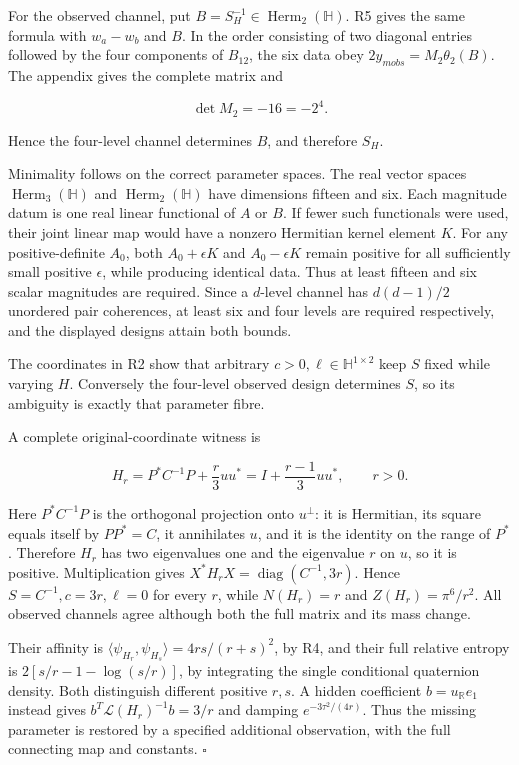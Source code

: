 \documentclass[
  11pt,
]{article}
\begin{document}
For the observed channel, put
\(B=S_H^{-1}\in\operatorname{Herm}_2(\mathbb H)\). R5 gives the same
formula with \(w_a-w_b\) and \(B\). In the order consisting of two
diagonal entries followed by the four components of \(B_{12}\), the six
data obey \(2y_{m obs}=M_2\theta_2(B)\). The appendix gives the complete
matrix and

\[
\det M_2=-16=-2^4.
\]

Hence the four-level channel determines \(B\), and therefore \(S_H\).

Minimality follows on the correct parameter spaces. The real vector
spaces \(\operatorname{Herm}_3(\mathbb H)\) and
\(\operatorname{Herm}_2(\mathbb H)\) have dimensions fifteen and six.
Each magnitude datum is one real linear functional of \(A\) or \(B\). If
fewer such functionals were used, their joint linear map would have a
nonzero Hermitian kernel element \(K\). For any positive-definite
\(A_0\), both \(A_0+\epsilon K\) and \(A_0-\epsilon K\) remain positive
for all sufficiently small positive \(\epsilon\), while producing
identical data. Thus at least fifteen and six scalar magnitudes are
required. Since a \(d\)-level channel has \(d(d-1)/2\) unordered pair
coherences, at least six and four levels are required respectively, and
the displayed designs attain both bounds.

The coordinates in R2 show that arbitrary
\(c>0,\ell\in\mathbb H^{1\times2}\) keep \(S\) fixed while varying
\(H\). Conversely the four-level observed design determines \(S\), so
its ambiguity is exactly that parameter fibre.

A complete original-coordinate witness is

\[
H_r=P^*C^{-1}P+\frac r3uu^*=I+\frac{r-1}{3}uu^*,\qquad r>0.
\]

Here \(P^*C^{-1}P\) is the orthogonal projection onto \(u^\perp\): it is
Hermitian, its square equals itself by \(PP^*=C\), it annihilates \(u\),
and it is the identity on the range of \(P^*\). Therefore \(H_r\) has
two eigenvalues one and the eigenvalue \(r\) on \(u\), so it is
positive. Multiplication gives
\(X^*H_rX=\operatorname{diag}(C^{-1},3r)\). Hence
\(S=C^{-1},c=3r,\ell=0\) for every \(r\), while \(N(H_r)=r\) and
\(Z(H_r)=\pi^6/r^2\). All observed channels agree although both the full
matrix and its mass change.

Their affinity is \(\langle\psi_{H_r},\psi_{H_s}\rangle=4rs/(r+s)^2\),
by R4, and their full relative entropy is \(2[s/r-1-\log(s/r)]\), by
integrating the single conditional quaternion density. Both distinguish
different positive \(r,s\). A hidden coefficient \(b=u_{\mathbb R}e_1\)
instead gives \(b^T\mathscr L(H_r)^{-1}b=3/r\) and damping
\(e^{-3\tau^2/(4r)}\). Thus the missing parameter is restored by a
specified additional observation, with the full connecting map and
constants. \ensuremath{\square}
\end{document}
